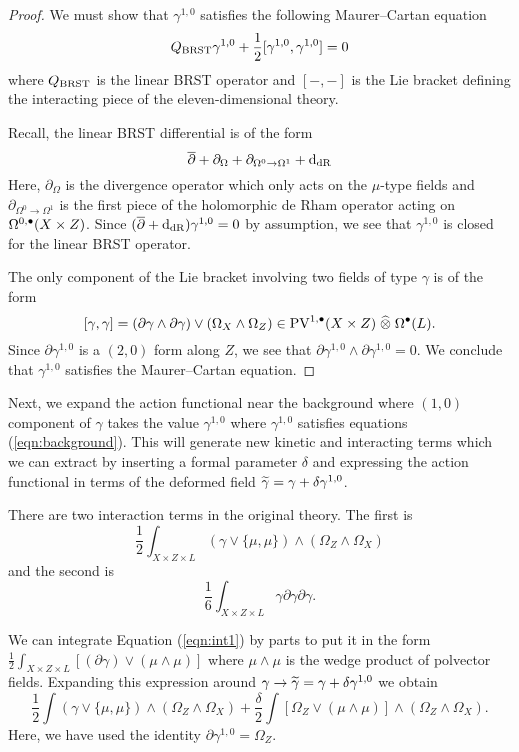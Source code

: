 \documentclass[11pt]{amsart}
\def\PV{{\rm PV}}
\begin{document}
\begin{proof}
  We must show that $\gamma^{1,0}$ satisfies the following Maurer--Cartan equation
  \[
    Q_{\rm BRST} \gamma^{1,0} + \frac12 [\gamma^{1,0} ,\gamma^{1,0}] = 0
  \]
  where $Q_{\rm BRST}$ is the linear BRST operator and $[-,-]$ is the Lie bracket defining the interacting piece of the eleven-dimensional theory.

Recall, the linear BRST differential is of the form
  \[
    \dbar + \partial_{\Omega} + \partial_{\Omega^0 \to \Omega^1} + \d_{\rm dR}
  \]
  Here, $\partial_\Omega$ is the divergence operator which only acts on the $\mu$-type fields and $\partial_{\Omega^0 \to \Omega^1}$ is the first piece of the holomorphic de Rham operator acting on $\Omega^{0,\bu}(X \times Z)$.
  Since $(\dbar + \d_{\rm dR}) \gamma^{1,0} = 0$ by assumption, we see that $\gamma^{1,0}$ is closed for the linear BRST operator.

The only component of the Lie bracket involving two fields of type $\gamma$ is of the form
  \[
    [\gamma, \gamma] = (\partial \gamma \wedge \partial \gamma) \vee (\Omega_X \wedge \Omega_Z) \in \PV^{1,\bu}(X \times Z) \; \Hat{\otimes} \; \Omega^\bu(L) .
  \]
  Since $\partial \gamma^{1,0}$ is a $(2,0)$ form along $Z$, we see that $\partial \gamma^{1,0} \wedge \partial \gamma^{1,0} =0$.
  We conclude that $\gamma^{1,0}$ satisfies the Maurer--Cartan equation.
\end{proof}

Next, we expand the action functional near the background where $(1,0)$ component of $\gamma$ takes the value $\gamma^{1,0}$ where $\gamma^{1,0}$ satisfies equations (\ref{eqn:background}).
This will generate new kinetic and interacting terms which we can extract by inserting a formal parameter $\delta$ and expressing the action functional in terms of the deformed field $\Tilde{\gamma} = \gamma + \delta \gamma^{1,0}$.

There are two interaction terms in the original theory.
The first is
\begin{equation}\label{eqn:int1}
  \frac12 \int_{X\times Z \times L} \left(\gamma \vee \{\mu, \mu\} \right) \wedge (\Omega_Z \wedge \Omega_X)
\end{equation}
and the second is
\begin{equation} \label{eqn:int2}
  \frac16\int_{X \times Z \times L} \gamma \partial \gamma \partial \gamma .
\end{equation}

We can integrate Equation (\ref{eqn:int1}) by parts to put it in the form $\frac12 \int_{X \times Z \times L} \left[(\partial \gamma) \vee (\mu \wedge \mu) \right]$ where $\mu \wedge \mu$ is the wedge product of polvector fields.
Expanding this expression around $\gamma \to \Tilde{\gamma} = \gamma + \delta \gamma^{1,0}$ we obtain
\[
  \frac12 \int \left(\gamma \vee \{\mu, \mu\} \right) \wedge (\Omega_Z \wedge \Omega_X) + \frac{\delta}{2} \int \left[\Omega_Z \vee (\mu \wedge \mu) \right] \wedge (\Omega_Z \wedge \Omega_X) .
\]
Here, we have used the identity $\partial \gamma^{1,0} = \Omega_Z$.
\end{document}
